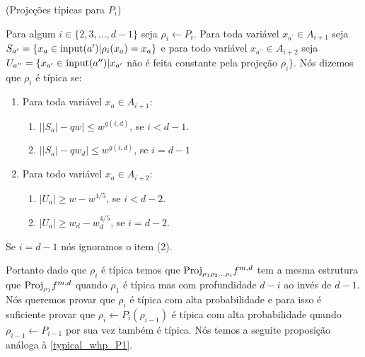 \begin{defi} (Projeções típicas para $P_{i}$) \label{typical_proj_Pi}

Para algum $i \in \{2, 3, \dots, d - 1\}$ seja $\rho_{i} \leftarrow P_{i}$. Para toda variável $x_{a^{\prime}} \in A_{i + 1}$ seja $S_{a^{\prime}} = \{x_{a} \in \text{input}(a^{\prime}) \lvert \rho_{i}(x_{a}) = x_{a}\}$ e para todo variável $x_{a^{\prime \prime}} \in A_{i + 2}$ seja $U_{a^{\prime \prime}} = \{x_{a^{\prime}} \in \text{input}(a^{\prime \prime}) \lvert x_{a^{\prime}} $ não é feita constante pela projeção $\rho_{i}\}$. Nós dizemos que $\rho_{i}$ é típica se:

\begin{enumerate}

	\item Para toda variável $x_{a} \in A_{i + 1}$:
	
	\begin{enumerate}
	
		\item $\big\lvert \lvert S_{a} \rvert - qw \big\rvert \leq w^{g(i, d)}$, se $i < d - 1$.
		
		\item $\big\lvert \lvert S_{a} \rvert - qw_{d} \big\rvert \leq w^{g(i, d)}$, se $i = d - 1$
	
	\end{enumerate}
	
	\item Para todo variável $x_{a} \in A_{i + 2}$:
	
	\begin{enumerate}
	
		\item $\lvert U_{a} \rvert \geq w - w^{4/5}$, se $i < d - 2$.
		
		\item $\lvert U_{a} \rvert \geq w_{d} - w_{d}^{4/5}$, se $i = d - 2$.
	
	\end{enumerate}

\end{enumerate}


Se $i = d - 1$ nós ignoramos o item (2).

\end{defi}

Portanto dado que $\rho_{i}$ é típica temos que $\text{Proj}_{\rho_{1}\rho_{2}\dots\rho_{i}}f^{m, d}$ tem a mesma estrutura que $\text{Proj}_{\rho_{1}}f^{m, d}$ quando $\rho_{1}$ é típica mas com profundidade $d - i$ ao invés de $d - 1$. Nós queremos provar que $\rho_{i}$ é típica com alta probabilidade e para isso é suficiente provar que $\rho_{i} \leftarrow P_{i}(\rho_{i - 1})$ é típica com alta probabilidade quando $\rho_{i - 1} \leftarrow P_{i - 1}$ por sua vez também é típica. Nós temos a seguite proposição análoga à \ref{typical_whp_P1}.

